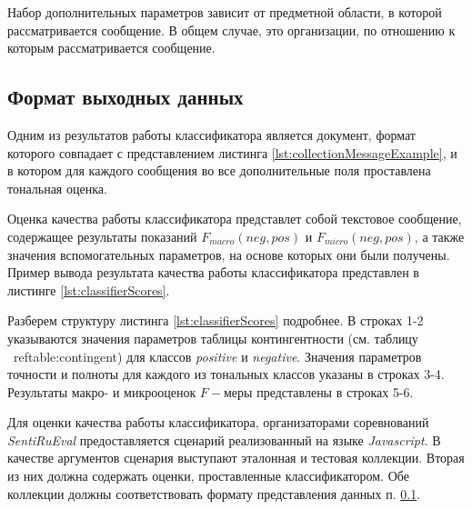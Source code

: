     Набор дополнительных параметров зависит от предметной области, в которой
    рассматривается сообщение. В общем случае, это организации, по отношению к
    которым рассматривается сообщение.

    \subsection{Формат выходных данных}
    \label{sec:programmingInnerFormat}
    Одним из результатов работы классификатора является \xml
    документ, формат которого совпадает с представлением листинга \ref{lst:collectionMessageExample},
    и в котором для каждого сообщения во все дополнительные поля проставлена
    тональная оценка.

    Оценка качества работы классификатора представлет собой текстовое сообщение,
    содержащее результаты показаний  $F_{macro}(neg, pos)$ и $F_{micro}(neg, pos)$,
    а также значения вспомогательных параметров, на основе которых они были
    получены. Пример вывода результата качества работы классификатора представлен
    в листинге \ref{lst:classifierScores}.

    \lstset{style=bash, numbers=left}
    

    Разберем структуру листинга \ref{lst:classifierScores} подробнее. В строках 1-2
    указываются значения параметров таблицы контингентности (см. таблицу \
    ref{table:contingent}) для классов {\it positive} и {\it negative}. Значения параметров точности и
    полноты для каждого из тональных классов указаны в строках 3-4. Результаты
    макро- и микрооценок $F-$меры представлены в строках 5-6.

    Для оценки качества работы классификатора, организаторами соревнований
    {\it SentiRuEval} предоставляется сценарий реализованный на языке {\it Javascript}.
    В качестве аргументов сценария выступают эталонная и тестовая коллекции.
    Вторая из них должна содержать оценки, проставленные классификатором. Обе
    коллекции должны соответствовать формату представления данных п. \ref{sec:programmingInnerFormat}.


